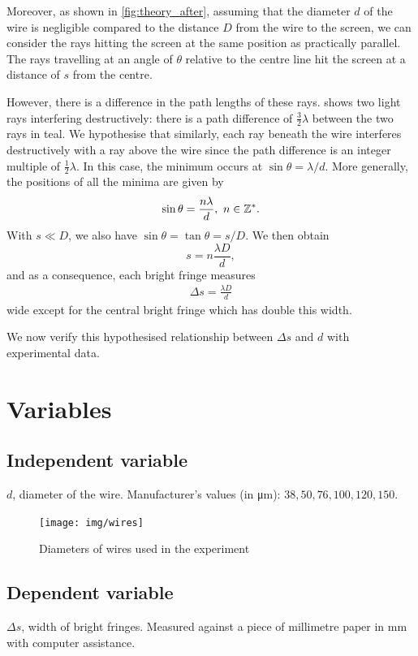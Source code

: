 \documentclass[a4paper, 12pt]{article}
\begin{document}
Moreover, as shown in \cref{fig:theory_after}, assuming that the diameter $d$ of the wire is negligible compared to the distance $D$ from the wire to the screen, we can consider the rays hitting the screen at the same position as practically parallel. 
The rays travelling at an angle of $\theta$ relative to the centre line hit the screen at a distance of $s$ from the centre.

However, there is a difference in the path lengths of these rays.  shows two light rays interfering destructively: 
there is a path difference of $\frac{3}{2}\lambda$ between the two rays in teal.
We hypothesise that similarly, each ray beneath the wire interferes destructively with a ray above the wire since the path difference is an integer multiple of $\frac{1}{2}\lambda$.
In this case, the minimum occurs at $\sin\theta = \lambda / d$.
More generally, the positions of all the minima are given by
\[\sin\theta = \frac{n \lambda}{d},\ n \in \mathbb{Z}^*.\]
With $s \ll D$, we also have $\sin\theta = \tan\theta = s / D$. 
We then obtain
\[
s = n \frac{\lambda D}{d},
\]
and as a consequence, each bright fringe measures
\begin{align}
    \Delta s = \frac{\lambda D}{d}\label{eq:hypothesis}
\end{align}
wide except for the central bright fringe which has double this width.

We now verify this hypothesised relationship between $\Delta s$ and $d$ with experimental data.

\section{Variables}
\subsection*{Independent variable}
$d$, diameter of the wire. Manufacturer's values (in \si{\um}): $38, 50, 76, 100, 120, 150$.
\begin{figure}[H]
    \centering
    \texttt{[image: img/wires]}
    \caption{Diameters of wires used in the experiment}
    \label{fig:wires}
\end{figure}

\subsection*{Dependent variable}
$\Delta s$, width of bright fringes. Measured against a piece of millimetre paper in \si{\mm} with computer assistance.
\end{document}
